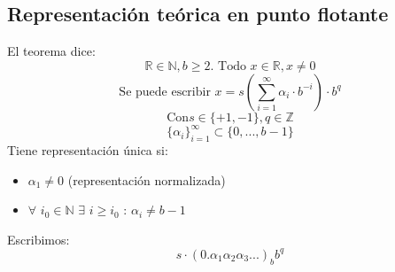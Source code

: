 \documentclass[11pt]{article}
\newcommand{\N}{\mathbb{N}}
\newcommand{\Z}{\mathbb{Z}}
\newcommand{\R}{\mathbb{R}}
\theoremstyle{plain}
\begin{document}
        \subsection{Representación teórica en punto flotante} %
        \label{sub:representación_teórica_en_punto_flotante}
        El teorema dice:
                \[\R \in \N, b \ge 2. \text{ Todo } x \in \R, x \ne 0\]
                \[\text{Se puede escribir } x = s (\sum_{i=1}^{\infty} \alpha_i \cdot b^{-i})\cdot b^q\]
                \[\text{Con} s \in \{+1,-1\}, q \in \Z\]
                \[\{\alpha_i\}_{i=1}^\infty \subset \{0,...,b-1\}\]
        Tiene representación única si:
        \begin{itemize}
            \item $\alpha_1 \ne 0$ (representación normalizada)
            \item $\forall$ $i_0 \in \N$ $\exists$ $i \ge i_0$ : $\alpha_i \ne b-1$
        \end{itemize}
        Escribimos:
            \[s\cdot (0.\alpha_1 \alpha_2 \alpha_3...)_b b^q\]
\end{document}

